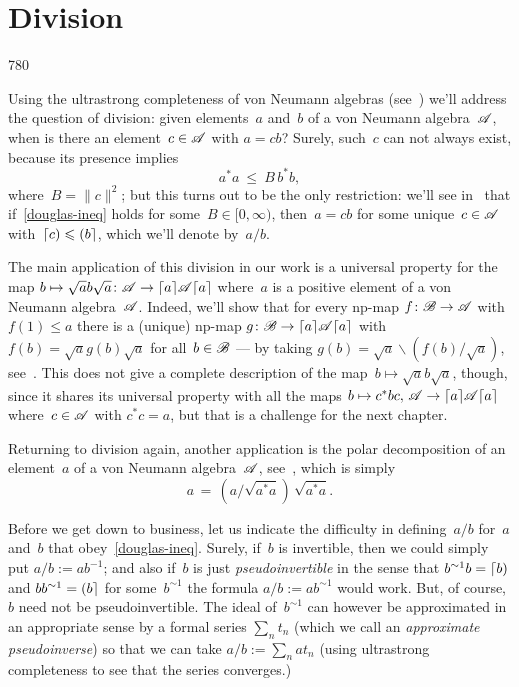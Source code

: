 \section{Division}
\label{S:division}
\begin{parsec}{780}%
\begin{point}{10}%
Using the ultrastrong completeness of von Neumann algebras
(see~)
we'll address
the question of division:
given elements~$a$ and~$b$ of a von Neumann algebra~$\mathscr{A}$,
when is there an element~$c\in\mathscr{A}$
with $a=cb$?
Surely, 
such~$c$ can not always exist,
because
its presence
implies
\begin{equation}
	\label{douglas-ineq}
	a^*a \ \leq \ B\, b^*b,
\end{equation}
where~$B=\|c\|^2$;
but this turns out to be the only restriction:
we'll see in~ that if~\eqref{douglas-ineq}
holds for some~$B\in [0,\infty)$,
then~$a=cb$ for some
unique~$c\in\mathscr{A}$
with~$\left\lceil c\right)\leqslant \left(b\right\rceil$,
which we'll denote by~$a/b$.

The main application of this division in our work
is a universal property
for the map $b\mapsto \sqrt{a}b\sqrt{a}\colon
\mathscr{A}\to\left\lceil a\right\rceil\!\mathscr{A}\!\left\lceil a\right\rceil$
where~$a$ is a positive element of a von Neumann algebra~$\mathscr{A}$.
Indeed,
we'll show that
for every np-map $f\colon \mathscr{B}\to \mathscr{A}$
with $f(1)\leq a$
there is a (unique) np-map $g\colon\mathscr{B}\to\left\lceil a\right\rceil\!\mathscr{A}\!\left\lceil a\right\rceil$
with~$f(b)=\sqrt{a}g(b)\sqrt{a}$ for all~$b\in\mathscr{B}$
---
by taking $g(b)=\sqrt{a}\backslash  (f(b) / \sqrt{a})$,
see~.
This does not give a complete description
of the map~$b\mapsto \sqrt{a}b\sqrt{a}$,
though,
since it shares its universal property
with all the maps
$b\mapsto c^*bc,\,\mathscr{A}\to\left\lceil a\right\rceil\!\mathscr{A}\!\left\lceil a\right\rceil$
where~$c\in\mathscr{A}$ with $c^*c = a$,
but that
is a  challenge for the next chapter.

Returning to division again,
another
application
is the polar decomposition
of an element~$a$ of a von Neumann algebra~$\mathscr{A}$,
see~,
which is simply
\begin{equation*}
	a \,=\, (a/ \sqrt{a^*a})\, \sqrt{a^*a}.
\end{equation*}

Before we get down to business,
let us indicate the difficulty
in defining~$a/b$
for~$a$ and~$b$ that obey~\eqref{douglas-ineq}.
Surely, if~$b$ is invertible,
then we could simply put $a/b:=ab^{-1}$;
and also if~$b$ is just \emph{pseudoinvertible}
in the sense that $b^{\sim 1 }b=\left\lceil b\right)$
and $bb^{\sim 1}=\left(b\right\rceil$
for some~$b^{\sim 1}$
the formula $a/b:=ab^{\sim 1}$ would work.
But,
of course,
$b$ need not be pseudoinvertible.
The  ideal of~$b^{\sim 1}$
can however be approximated
in an appropriate sense by a formal series $\sum_n t_n$ 
(which we call an \emph{approximate pseudoinverse})
so that we can take
$a/b:= \sum_n a t_n$
(using ultrastrong completeness to see that
the series converges.)
\end{point}
\end{parsec}
